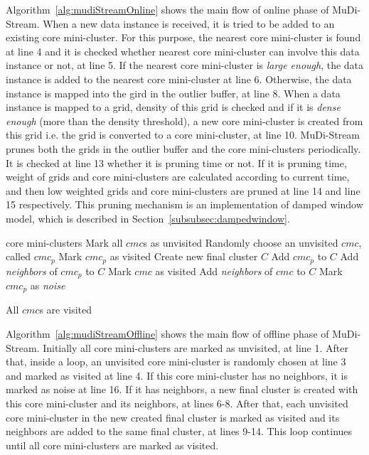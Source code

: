 \documentclass[smallcondensed]{svjour3}     %
\begin{document}
Algorithm~\ref{alg:mudiStreamOnline} shows the main flow of online phase of MuDi-Stream. When a new data instance is received, it is tried to be added to an existing core mini-cluster. For this purpose, the nearest core mini-cluster is found at line 4 and it is checked whether nearest core mini-cluster can involve this data instance or not, at line 5. If the nearest core mini-cluster is \textit{large enough}, the data instance is added to the nearest core mini-cluster at line 6. Otherwise, the data instance is mapped into the gird in the outlier buffer, at line 8. When a data instance is mapped to a grid, density of this grid is checked and if it is \textit{dense enough} (more than the density threshold), a new core mini-cluster is created from this grid i.e. the grid is converted to a core mini-cluster, at line 10. MuDi-Stream prunes both the grids in the outlier buffer and the core mini-clusters periodically. It is checked at line 13 whether it is pruning time or not. If it is pruning time, weight of grids and core mini-clusters are calculated according to current time, and then low weighted grids and core mini-clusters are pruned at line 14 and line 15 respectively. This pruning mechanism is an implementation of damped window model, which is described in Section~\ref{subsubsec:dampedwindow}.

\begin{algorithm}
	\caption{MuDi-Stream offline phase (core mini-clusters)}
	\label{alg:mudiStreamOffline}
	\begin{algorithmic}[1]
		\Require core mini-clusters
		\State Mark all $cmc$s as unvisited
		\Repeat
			\State Randomly choose an unvisited $cmc$, called $cmc_p$
			\State Mark $cmc_p$ as visited
				\State Create new final cluster $C$
				\State Add $cmc_p$ to $C$
				\State Add \textit{neighbors} of $cmc_p$ to $C$
						\State Mark $cmc$ as visited
						\State Add \textit{neighbors} of $cmc$ to $C$
					\EndIf
				\EndFor
			\Else
				\State Mark $cmc_p$ as \textit{noise}
			\EndIf
			
		\Until All $cmc$s are visited
	\end{algorithmic}
\end{algorithm}

Algorithm~\ref{alg:mudiStreamOffline} shows the main flow of offline phase of MuDi-Stream. Initially all core mini-clusters are marked as unvisited, at line 1. After that, inside a loop, an unvisited core mini-cluster is randomly chosen at line 3 and marked as visited at line 4. If this core mini-cluster has no neighbors, it is marked as noise at line 16. If it has neighbors, a new final cluster is created with this core mini-cluster and its neighbors, at lines 6-8. After that, each unvisited core mini-cluster in the new created final cluster is marked as visited and its neighbors are added to the same final cluster, at lines 9-14. This loop continues until all core mini-clusters are marked as visited. 
\end{document}

